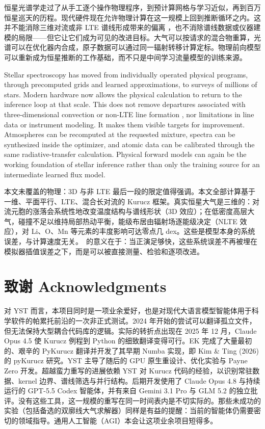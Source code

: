 恒星光谱学走过了从手工逐个操作物理程序，到预计算网格与学习近似，再到百万恒星巡天的历程。现代硬件现在允许物理计算在这一规模上回到推断循环之内。这并不能消除三维对流或非 LTE 谱线形成带来的偏离 \citep{Asplund2005,Nordlund2009,Magic2013,BergemannNordlander2014,Amarsi2019}，也不消除谱线数据或仪器建模的局限——但它让它们成为可见的改进目标。大气可以按请求的混合物重算，光谱可以在优化器内合成，原子数据可以通过同一辐射转移计算定标。物理前向模型可以重新成为恒星推断的工作基础，而不只是中间学习流量模型的训练来源。

\begin{EN}
Stellar spectroscopy has moved from individually operated physical programs,
through precomputed grids and learned approximations, to surveys of millions
of stars. Modern hardware now allows the physical calculation to return to the
inference loop at that scale. This does not remove departures associated with
three-dimensional convection or non-LTE line formation
\citep{Asplund2005,Nordlund2009,Magic2013,BergemannNordlander2014,Amarsi2019}, nor limitations
in line data or instrument modeling. It makes them
visible targets for improvement. Atmospheres can be recomputed at the requested
mixture, spectra can be synthesized inside the optimizer, and atomic data can
be calibrated through the same radiative-transfer calculation. Physical
forward models can again be the working foundation of stellar inference rather
than only the training source for an intermediate learned flux model.
\end{EN}

\begin{physbox}{本文未覆盖的物理：3D 与非 LTE}
最后一段的限定值得强调。本文全部计算基于一维、平面平行、LTE、混合长对流的 Kurucz 框架。真实恒星大气是三维的：对流元胞的涨落会系统性地改变温度结构与谱线形状（3D 效应）；在低密度高层大气，碰撞不足以维持局部热动平衡，能级布居由辐射场逐能级决定（NLTE 效应），对 Li、O、Mn 等元素的丰度影响可达零点几 dex。这些是模型本身的系统误差，与计算速度无关。\paynezero\ 的意义在于：当正演足够快，这些系统误差不再被埋在模拟器插值误差之下，而是可以被直接测量、检验和逐项改进。
\end{physbox}

\section*{致谢 Acknowledgments}

对 YST 而言，本项目同时是一项业余爱好，也是对现代大语言模型智能体用于科学软件的帕累托前沿的一次非正式测试。2024 年开始的尝试可以翻译孤立文件，但无法保持大型耦合代码库的逻辑。实际的转折点出现在 2025 年 12 月，Claude Opus 4.5 使 Kurucz 例程到 Python 的细致翻译变得可行。EK 完成了大量最初的、艰辛的 PyKurucz 翻译并开发了其早期 Numba 实现，即 Kim \& Ting (2026) 的 pyKurucz 研究。YST 主导了随后的 GPU 原生重设计、优化实验与 Payne Zero 开发。超越蛮力重写的进展依赖 YST 对 Kurucz 代码的经验，以识别常驻数据、kernel 边界、谱线筛选与并行结构。后期开发使用了 Claude Opus 4.8 与持续运行的 GPT-5.5 Codex 智能体，并有来自 Gemini 3.1 Pro 与 GLM 5.2 的独立批评。没有这些工具，这一规模的重写在同一时间表内是不切实际的。那些未成功的实验（包括备选的双廓线大气求解器）同样是有益的提醒：当前的智能体仍需要密切的领域指导。通用人工智能（AGI）本会让这项业余项目短得多。

